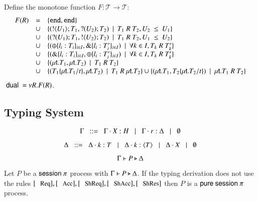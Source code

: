 \begin{definition}
Define the monotone function $F: \mathcal{T} \longrightarrow \mathcal{T}$:
%
\[
	\begin{array}{rcl}
		F(R)	& = &	\{\mathtt{end}, \mathtt{end}\}\\
			&\cup&	\{(! \langle U_1 \rangle ; T_1, ? (U_2) ; T_2) \ \ |\ \  T_1\ R\ T_2, U_2\ \leq\ U_1\}\\
			&\cup&	\{(? (U_1) ; T_1, ! \langle U_2 \rangle ; T_2) \ \ |\ \  T_1\ R\ T_2, U_1\ \leq\ U_2\}\\
			&\cup&	\{(\oplus \{l_i: T_i\}_{i \in I}, \& \{l_i: T'_i\}_{i \in I}) \ \ |\ \  \forall k \in I, T_k\ R\ T'_k\}\\
			&\cup&	\{(\& \{l_i: T_i\}_{i \in I}, \oplus \{l_i: T'_i\}_{i \in I}) \ \ |\ \  \forall k \in I, T_k\ R\ T'_k\}\\
			&\cup&	\{(\mu\mathsf{t}.T_1, \mu\mathsf{t}.T_2) \ \ |\ \  T_1\ R\ T_2\}\\
			&\cup&	\{(T_1\{\mu\mathsf{t}.T_1/t \}, \mu\mathsf{t}.T_2) \ \ |\ \  T_1\ R\ \mu\mathsf{t}.T_2\}
			\cup	\{(\mu\mathsf{t}.T_1, T_2\{\mu\mathsf{t}.T_2/t \}) \ \ |\ \  \mu\mathsf{t}.T_1\ R\ T_2\}\\
	\end{array}
\]
%
$\ \mathsf{dual}\  = \nu R.F(R)$.
\end{definition}

\subsection{Typing System}

\[
	\Gamma \;\;::=\;\; \Gamma \cdot X: H \;\;\;|\;\;\; \Gamma \cdot r:\Delta \;\;\;|\;\;\; \emptyset
\]

\[
	\Delta \;\;::=\;\; \Delta \cdot k:T \;\;\;|\;\;\; \Delta \cdot k: \langle T \rangle \;\;\;|\;\;\; \Delta \cdot X \;\;\;|\;\;\; \emptyset
\]

\[
	\Gamma \vdash P \triangleright \Delta
\]


%

\begin{definition}[$\ppi$]
	Let $P$ be a $\mathsf{session\ }\pi$ process with $\Gamma \vdash P \triangleright \Delta$.
	If the typing derivation does not use the rules
	$\trule{Req}, \trule{Acc}, \trule{ShReq}, \trule{ShAcc}, \trule{ShRes}$ then
	$P$ is a $\ppi$ process.
\end{definition}

